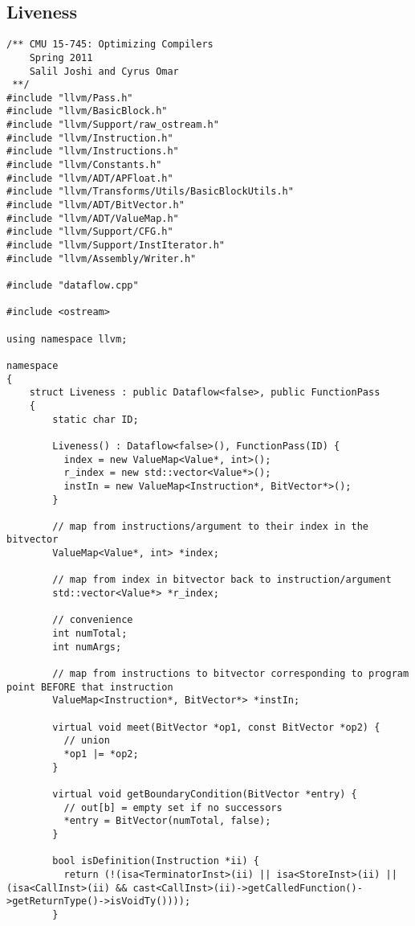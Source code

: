 \documentclass[12pt]{article}
\begin{document}
\subsection{Liveness}
\begin{verbatim}
/** CMU 15-745: Optimizing Compilers
    Spring 2011
    Salil Joshi and Cyrus Omar
 **/
#include "llvm/Pass.h"
#include "llvm/BasicBlock.h"
#include "llvm/Support/raw_ostream.h"
#include "llvm/Instruction.h"
#include "llvm/Instructions.h"
#include "llvm/Constants.h"
#include "llvm/ADT/APFloat.h"
#include "llvm/Transforms/Utils/BasicBlockUtils.h"
#include "llvm/ADT/BitVector.h"
#include "llvm/ADT/ValueMap.h"
#include "llvm/Support/CFG.h"
#include "llvm/Support/InstIterator.h"
#include "llvm/Assembly/Writer.h"

#include "dataflow.cpp"

#include <ostream>

using namespace llvm;

namespace
{
    struct Liveness : public Dataflow<false>, public FunctionPass
    {
        static char ID;

        Liveness() : Dataflow<false>(), FunctionPass(ID) {
          index = new ValueMap<Value*, int>();
          r_index = new std::vector<Value*>();
          instIn = new ValueMap<Instruction*, BitVector*>();
        }

        // map from instructions/argument to their index in the bitvector
        ValueMap<Value*, int> *index;
        
        // map from index in bitvector back to instruction/argument
        std::vector<Value*> *r_index;
        
        // convenience
        int numTotal;
        int numArgs;

        // map from instructions to bitvector corresponding to program point BEFORE that instruction
        ValueMap<Instruction*, BitVector*> *instIn;

        virtual void meet(BitVector *op1, const BitVector *op2) {
          // union
          *op1 |= *op2;
        }

        virtual void getBoundaryCondition(BitVector *entry) {
          // out[b] = empty set if no successors
          *entry = BitVector(numTotal, false);
        }
        
        bool isDefinition(Instruction *ii) {
          return (!(isa<TerminatorInst>(ii) || isa<StoreInst>(ii) || (isa<CallInst>(ii) && cast<CallInst>(ii)->getCalledFunction()->getReturnType()->isVoidTy())));
        }


\end{verbatim}
\end{document}
